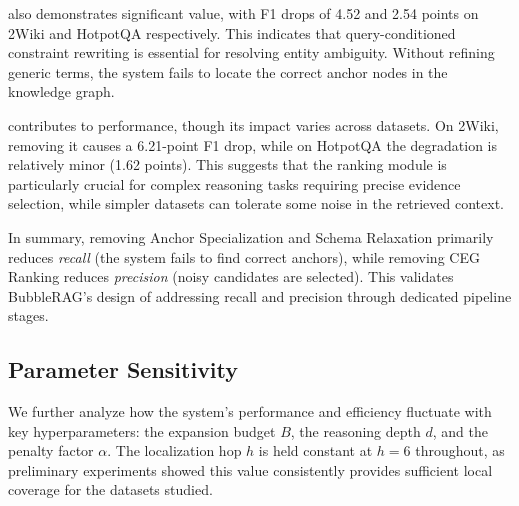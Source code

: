  also demonstrates significant value, with F1 drops of 4.52 and 2.54 points on 2Wiki and HotpotQA respectively. This indicates that query-conditioned constraint rewriting is essential for resolving entity ambiguity. Without refining generic terms, the system fails to locate the correct anchor nodes in the knowledge graph.

 contributes to performance, though its impact varies across datasets. On 2Wiki, removing it causes a 6.21-point F1 drop, while on HotpotQA the degradation is relatively minor (1.62 points). This suggests that the ranking module is particularly crucial for complex reasoning tasks requiring precise evidence selection, while simpler datasets can tolerate some noise in the retrieved context.

In summary, removing Anchor Specialization and Schema Relaxation primarily reduces \emph{recall} (the system fails to find correct anchors), while removing CEG Ranking reduces \emph{precision} (noisy candidates are selected). This validates BubbleRAG's design of addressing recall and precision through dedicated pipeline stages.


\subsection{Parameter Sensitivity}

We further analyze how the system's performance and efficiency fluctuate with key hyperparameters: the expansion budget $B$, the reasoning depth $d$, and the penalty factor $\alpha$. The localization hop $h$ is held constant at $h=6$ throughout, as preliminary experiments showed this value consistently provides sufficient local coverage for the datasets studied.

